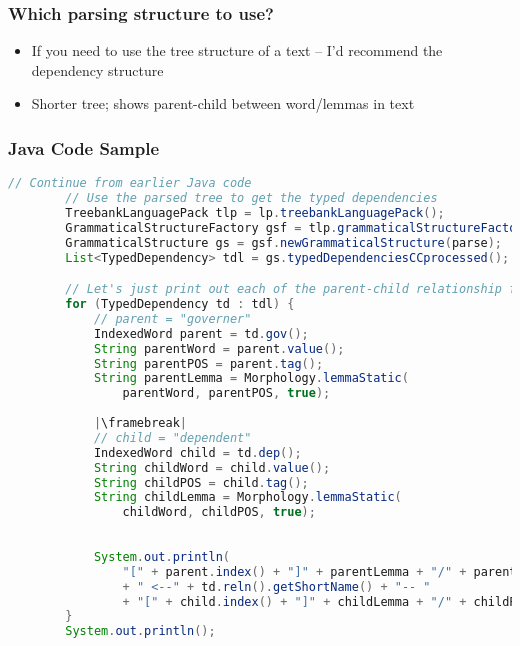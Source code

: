 \begin{frame}
\frametitle{Which parsing structure to use?}

\begin{itemize}
\item If you need to use the tree structure of a text -- I'd recommend the \alert{dependency} structure
\item Shorter tree; shows parent-child between word/lemmas in text
\end{itemize}
\end{frame} 


\begin{frame}
\frametitle{Java Code Sample}
    
\begin{lstlisting}[language=Java,basicstyle=\ttfamily\footnotesize,gobble=8,
    emph={parse,lp,typedDependenciesCCprocessed,lemmaStatic,dep,gov,reln,index,tag,value},
    morekeywords={TreebankLanguagePack,GrammaticalStructureFactory,GrammaticalStructure,
        List,TypedDependency,IndexedWord,String,Morphology},
        escapechar=|]
        // Continue from earlier Java code 
        // Use the parsed tree to get the typed dependencies
        TreebankLanguagePack tlp = lp.treebankLanguagePack();
        GrammaticalStructureFactory gsf = tlp.grammaticalStructureFactory();
        GrammaticalStructure gs = gsf.newGrammaticalStructure(parse);
        List<TypedDependency> tdl = gs.typedDependenciesCCprocessed();

        // Let's just print out each of the parent-child relationship first
        for (TypedDependency td : tdl) {
            // parent = "governer"
            IndexedWord parent = td.gov();
            String parentWord = parent.value();
            String parentPOS = parent.tag();
            String parentLemma = Morphology.lemmaStatic(
                parentWord, parentPOS, true);
            
            |\framebreak|
            // child = "dependent"
            IndexedWord child = td.dep();
            String childWord = child.value();
            String childPOS = child.tag();
            String childLemma = Morphology.lemmaStatic(
                childWord, childPOS, true);
            
            
            System.out.println(
                "[" + parent.index() + "]" + parentLemma + "/" + parentPOS 
                + " <--" + td.reln().getShortName() + "-- "
                + "[" + child.index() + "]" + childLemma + "/" + childPOS);
        }
        System.out.println();
\end{lstlisting}

\end{frame}


